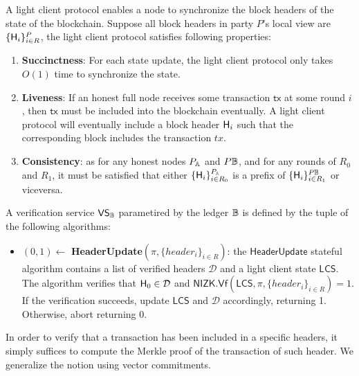 \begin{definition}
A light client protocol enables a node to synchronize the block headers of the state of the
blockchain. Suppose all block headers in party $P$’s local view are $\{ \mathsf{H}_i \}^P_{i \in R}$, 
the light client protocol satisfies following properties:
\begin{enumerate}
	\item \textbf{Succinctness}: For each state update, the light client protocol only takes $O(1)$ time to synchronize the state.
	\item \textbf{Liveness}: If an honest full node receives some transaction $\mathsf{tx}$ at some round $i$, then $\mathsf{tx}$ must be included into the blockchain eventually. A light client protocol will eventually include a block header $\mathsf{H}_i$ such that the corresponding block includes the transaction $tx$.
        \item \textbf{Consistency}: as for any honest nodes $P_{\mathbb{A}}$ and $P{\mathbb{B}}$, and for any rounds of $R_0$ and $R_1$, it must be satisfied that either $\{ \mathsf{H}_i \}^{P_{\mathbb{A}}}_{i \in R_0}$ is a prefix of $\{ \mathsf{H}_i \}^{P{\mathbb{B}}}_{i \in R_1}$ or viceversa.
\end{enumerate}
\end{definition}


\begin{definition}
A verification service $\mathsf{VS}_{\mathbb{B}}$ parametired by the ledger $\mathbb{B}$ is defined by the tuple of the following algorithms:
\begin{itemize}[topsep=0pt, itemsep=0pt, leftmargin=2em]
    \item $(0,1) \gets$ \textbf{HeaderUpdate}$(\pi, \{ header_i \}_{i \in R})$: the $\mathsf{HeaderUpdate}$ stateful algorithm contains a list of verified headers $\mathcal{D}$ and a light client state $\mathsf{LCS}$. \\ The algorithm verifies that $\mathsf{H}_0 \in \mathcal{D}$ and $\mathsf{NIZK}.\mathsf{Vf}(\mathsf{LCS}, \pi, \{ header_i \}_{i \in R}) = 1$. If the verification succeeds, update $\mathsf{LCS}$ and $\mathcal{D}$ accordingly, returning 1. Otherwise, abort returning 0.
\end{itemize}
\end{definition}

In order to verify that a transaction has been included in a specific headers, it simply suffices to compute the Merkle proof of the transaction of such header. We generalize the notion using vector commitments.

